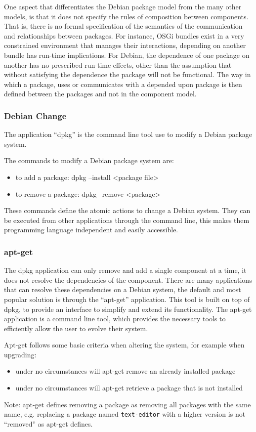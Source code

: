 One aspect that differentiates the Debian package model from the many other models, is that it does not specify the rules of composition between components.
That is, there is no formal specification of the semantics of the communication and relationships between packages.
For instance, OSGi bundles exist in a very constrained environment that manages their interactions, depending on another bundle has run-time implications.
For Debian, the dependence of one package on another has no prescribed run-time effects, other than the assumption that without satisfying the dependence the package will not be functional.
The way in which a package, uses or communicates with a depended upon package is then defined between the packages and not in the component model.

\subsubsection{Debian Change}
The application ``dpkg'' is the command line tool use to modify a Debian package system.

The commands to modify a Debian package system are:
\begin{itemize}
  \item to add a package: dpkg --install <package file>
  \item to remove a package: dpkg --remove <package>
\end{itemize}

These commands define the atomic actions to change a Debian system.
They can be executed from other applications through the command line, this makes them programming language independent and easily accessible. 

\subsubsection{apt-get}
The dpkg application can only remove and add a single component at a time, it does not resolve the dependencies of the component.
There are many applications that can resolve these dependencies on a Debian system, the default and most popular solution is through the ``apt-get'' application.
This tool is built on top of dpkg, to provide an interface to simplify and extend its functionality.
The apt-get application is a command line tool, which provides the necessary tools to efficiently allow the user to evolve their system.

Apt-get follows some basic criteria when altering the system, for example when upgrading:
\begin{itemize}
  \item under no circumstances will apt-get remove an already installed package
  \item under no circumstances will apt-get retrieve a package that is not installed
\end{itemize}
Note: apt-get defines removing a package as removing all packages with the same name, e.g. replacing a package named \texttt{text-editor} with a higher version is not ``removed'' as apt-get defines.

